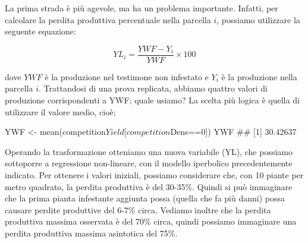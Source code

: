 \documentclass[a4paper,12pt,oneside]{book}
\newenvironment{Shaded}{\begin{snugshade}}{\end{snugshade}}
\newcommand{\DecValTok}[1]{#1}
\newcommand{\SpecialCharTok}[1]{#1}
\newcommand{\DocumentationTok}[1]{#1}
\newcommand{\OtherTok}[1]{#1}
\newcommand{\FunctionTok}[1]{#1}
\newcommand{\NormalTok}[1]{#1}
\begin{document}
La prima strada è più agevole, ma ha un problema importante. Infatti, per calcolare la perdita produttiva percentuale nella parcella \(i\), possiamo utilizzare la seguente equazione:

\[YL_i = \frac{YWF - Y_i}{YWF} \times 100\]

dove \(YWF\) è la produzione nel testimone non infestato e \(Y_i\) è la produzione nella parcella \(i\). Trattandosi di una prova replicata, abbiamo quattro valori di produzione corrispondenti a YWF; quale usiamo? La scelta più logica è quella di utilizzare il valore medio, cioè;

\begin{Shaded}
\begin{Highlighting}[]
\NormalTok{YWF }\OtherTok{\textless{}{-}} \FunctionTok{mean}\NormalTok{(competition}\SpecialCharTok{$}\NormalTok{Yield[competition}\SpecialCharTok{$}\NormalTok{Dens}\SpecialCharTok{==}\DecValTok{0}\NormalTok{])}
\NormalTok{YWF}
\DocumentationTok{\#\# [1] 30.42637}
\end{Highlighting}
\end{Shaded}

Operando la trasformazione otteniamo una nuova variabile (YL), che possiamo sottoporre a regressione non-lineare, con il modello iperbolico precedentemente indicato. Per ottenere i valori iniziali, possiamo considerare che, con 10 piante per metro quadrato, la perdita produttiva è del 30-35\%. Quindi si può immaginare che la prima pianta infestante aggiunta possa (quella che fa più danni) possa causare perdite produttive del 6-7\% circa. Vediamo inoltre che la perdita produttiva massima osservata è del 70\% circa, quindi possiamo immaginare una perdita produttiva massima asintotica del 75\%.
\end{document}
